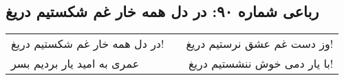 \begin{center}
\section*{رباعی شماره ۹۰: در دل همه خار غم شکستیم دریغ}
\label{sec:090}
\begin{longtable}{l p{0.5cm} r}
در دل همه خار غم شکستیم دریغ!
&&
وز دست غم عشق نرستیم دریغ!
\\
عمری به امید یار بردیم بسر
&&
با یار دمی خوش ننشستیم دریغ!
\\
\end{longtable}
\end{center}
